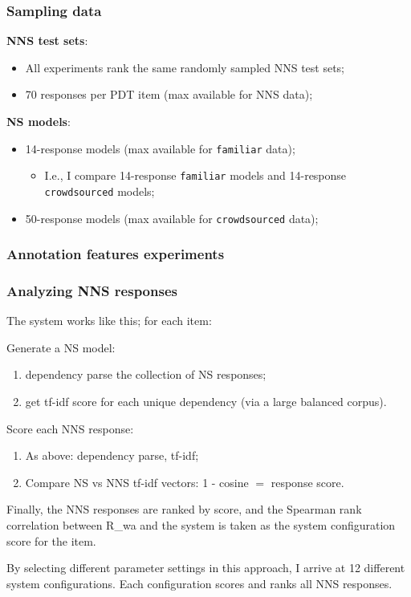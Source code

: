 \documentclass[handout,xcolor={dvipsnames}]{beamer}
\newcommand{\param}[1]{\texttt{#1}}
\begin{document}
\begin{frame}
\frametitle{Sampling data}

\pause
\textbf{NNS test sets}:
\begin{itemize}
\item All experiments rank the same randomly sampled NNS test sets;
\item 70 responses per PDT item (max available for NNS data);
\end{itemize}

\vspace{1.5em}

\pause
\textbf{NS models}:
\begin{itemize}
\item 14-response models (max available for \param{familiar} data);
\begin{itemize}
\item I.e., I compare 14-response \param{familiar} models and 14-response \param{crowd\-sourced} models;
\end{itemize}
\item 50-response models (max available for \param{crowdsourced} data);
\end{itemize}
\end{frame}


\begin{frame}
\frametitle{Annotation features experiments}


\end{frame}

\begin{frame}
\frametitle{Analyzing NNS responses}
\small
The system works like this; for each item:

\medskip
Generate a NS model:
\begin{enumerate}
\item dependency parse the collection of NS responses;
\item get tf-idf score for each unique dependency (via a large balanced corpus).
\end{enumerate}

\medskip

Score each NNS response:
\begin{enumerate}
\item As above: dependency parse, tf-idf;
\item Compare NS vs NNS tf-idf vectors: 1 - cosine $=$ response score.
\end{enumerate}

Finally, the NNS responses are ranked by score, and the Spearman rank correlation between R_{wa} and the system is taken as the system configuration score for the item.

\bigskip

By selecting different parameter settings in this approach, I arrive at 12 different system configurations. Each configuration scores and ranks all NNS responses.

\end{frame}
\end{document}
